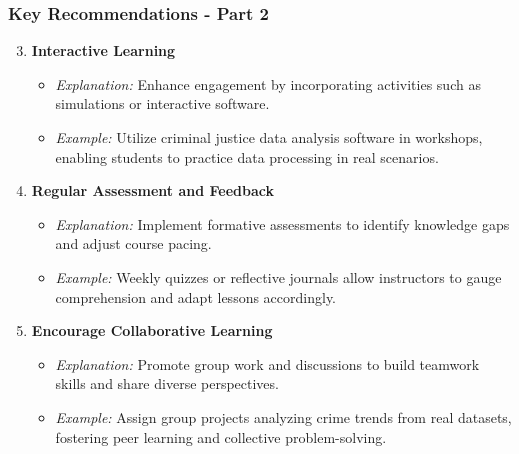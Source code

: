 \documentclass[aspectratio=169]{beamer}
\begin{document}
\begin{frame}[fragile]
    \frametitle{Key Recommendations - Part 2}
    \begin{enumerate}
        \setcounter{enumi}{2} %
        \item \textbf{Interactive Learning}
            \begin{itemize}
                \item \textit{Explanation:} Enhance engagement by incorporating activities such as simulations or interactive software.
                \item \textit{Example:} Utilize criminal justice data analysis software in workshops, enabling students to practice data processing in real scenarios.
            \end{itemize}

        \item \textbf{Regular Assessment and Feedback}
            \begin{itemize}
                \item \textit{Explanation:} Implement formative assessments to identify knowledge gaps and adjust course pacing.
                \item \textit{Example:} Weekly quizzes or reflective journals allow instructors to gauge comprehension and adapt lessons accordingly.
            \end{itemize}

        \item \textbf{Encourage Collaborative Learning}
            \begin{itemize}
                \item \textit{Explanation:} Promote group work and discussions to build teamwork skills and share diverse perspectives.
                \item \textit{Example:} Assign group projects analyzing crime trends from real datasets, fostering peer learning and collective problem-solving.
            \end{itemize}
    \end{enumerate}
\end{frame}
\end{document}
